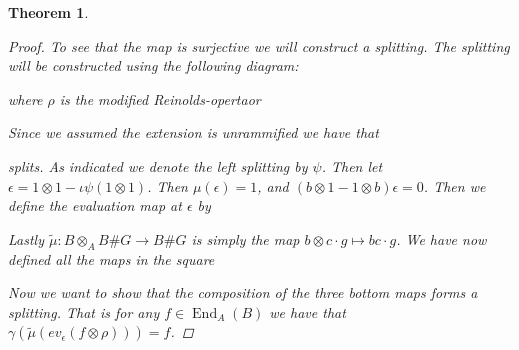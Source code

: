 \documentclass[11pt, a4paper, english]{article}
\numberwithin{prop}{section}
\numberwithin{lemma}{section}
\newtheorem{theorem}{Theorem}
\numberwithin{theorem}{section}
\numberwithin{defin}{section}
\numberwithin{example}{section}
\DeclareMathOperator{\Hom}{Hom}
\DeclareMathOperator{\End}{End}
\begin{document}
\begin{theorem}
\begin{proof}
To see that the map is surjective we will construct a splitting. The splitting will be constructed using the following diagram:
\begin{center}
\end{center}
where $\rho$ is the modified Reinolds-opertaor
\begin{center}
\end{center}
Since we assumed the extension is unrammified we have that
\begin{center}
\end{center}
splits. As indicated we denote the left splitting by $\psi$. Then let $\epsilon = 1 \otimes 1 - \iota\psi(1 \otimes 1)$. Then $\mu(\epsilon) = 1$, and $(b \otimes 1 - 1 \otimes b)\epsilon = 0$. Then we define the evaluation map at $\epsilon$ by
\begin{center}
\end{center}
Lastly $\tilde{\mu}: B \otimes_A B\#G \to B\#G$ is simply the map $b \otimes c \cdot g \mapsto bc \cdot g$. We have now defined all the maps in the square 
\begin{center}
\end{center}
Now we want to show that the composition of the three bottom maps forms a splitting. That is for any $f \in \End_A(B)$ we have that $\gamma(\tilde{\mu}(ev_\epsilon(f \otimes \rho))) = f$.


\end{proof}
\end{theorem}
\end{document}

